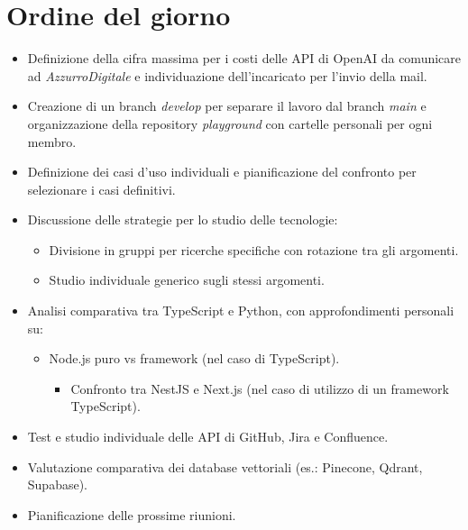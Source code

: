

\section{Ordine del giorno}

\begin{itemize}
    \item Definizione della cifra massima per i costi delle API di OpenAI da comunicare ad \emph{AzzurroDigitale} e individuazione dell'incaricato per l'invio della mail.
    \item Creazione di un branch \emph{develop} per separare il lavoro dal branch \emph{main} e organizzazione della repository \emph{playground} con cartelle personali per ogni membro.
    \item Definizione dei casi d'uso individuali e pianificazione del confronto per selezionare i casi definitivi.
    \item Discussione delle strategie per lo studio delle tecnologie:
    \begin{itemize}
        \item Divisione in gruppi per ricerche specifiche con rotazione tra gli argomenti.
        \item Studio individuale generico sugli stessi argomenti.
    \end{itemize}
    \item Analisi comparativa tra TypeScript e Python, con approfondimenti personali su:
    \begin{itemize}
        \item Node.js puro vs framework (nel caso di TypeScript).
        \begin{itemize}
            \item Confronto tra NestJS e Next.js (nel caso di utilizzo di un framework TypeScript).
        \end{itemize}
    \end{itemize}
    \item Test e studio individuale delle API di GitHub, Jira e Confluence.
    \item Valutazione comparativa dei database vettoriali (es.: Pinecone, Qdrant, Supabase).
    \item Pianificazione delle prossime riunioni.
\end{itemize}